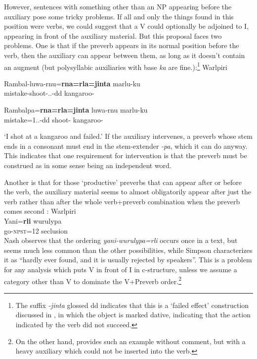 \documentclass[output=paper,hidelinks]{langscibook}
\begin{document}
However, sentences with something other than an NP appearing before the auxiliary 
pose some tricky problems.  If all and only the things found in this position were
verbs, we could suggest that a V could optionally be adjoined to I,
appearing in front of the auxiliary material.  But this proposal faces two problems.
One is that if the preverb appears in its normal position before the verb, then
the auxiliary can appear between them, as long as it doesn't contain
an augment (but polysyllabic auxiliaries with base {\it ka} are fine.):\footnote
 {The suffix {\it -jinta} glossed {\sc dd} indicates that this is a `failed effect'
  construction discussed in \citet[336]{Hale1973}, in which the object is marked dative, indicating that the action
  indicated by the verb did not succeed.}
\ea\label{warlphrase} Warlpiri  \citep[227]{AustBres96}\\
\begin{xlist}
\item
\gll Rambal-luwa-rnu={\bf rna=rla=jinta} marlu-ku\\
mistake-shoot-\SG.\SG.\DAT-{\sc dd}  kangaroo-\DAT\\
\item
\gll Rambalpa={\bf rna=rla=jinta} luwa-rnu marlu-ku\\
mistake=1\SG.\SG.\DAT-{\sc dd} shoot-{\PST}  kangaroo-\DAT\\
\end{xlist}
`I shot at a kangaroo and failed.'
\z
If the auxiliary intervenes, a preverb whose stem ends in a consonant must end in the stem-extender
{\it -pa}, which it can do anyway.  This indicates that one requirement for
intervention is that the preverb must be construed as in some sense being an independent
word.

Another is that for those `productive' preverbs that can appear after or before the verb, the auxiliary material seems to almost obligatorily
appear after just the verb rather than after the whole verb+preverb combination
when the preverb comes second \citep[117]{Simpson1991}:
\ea Warlpiri \citep[52]{Nash1986}\\
\gll Yani={\bf rli} wurulypa\\
go-\textsc{npst}=12 seclusion\\
\z
Nash observes that the ordering {\it yani-wurulypa=rli} occurs once in a text,
but seems much less common than the other possibilities, while Simpson characterizes
it as ``hardly ever found, and it is usually rejected by speakers''.  This is a problem
for any analysis which puts V in front of I in c-structure, unless we assume
a category other than V to dominate the V+Preverb order.\footnote
  {On the other hand, \citet[100]{Laughren2002} provides such an example without
  comment, but with a heavy auxiliary which could not be inserted into the verb.}
\end{document}
